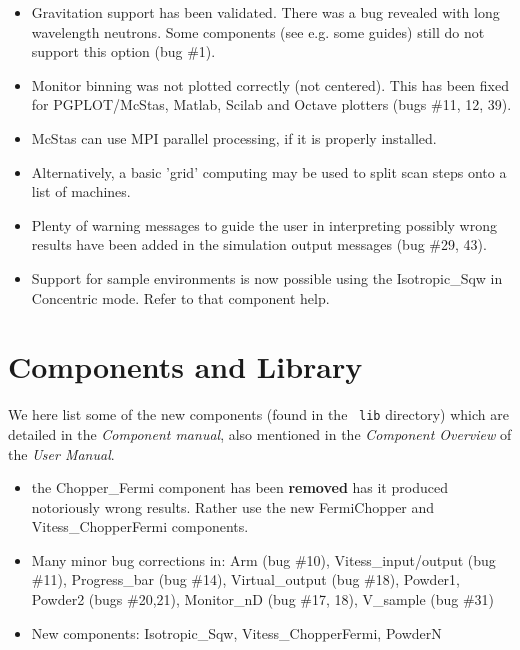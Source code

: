 \begin{itemize}
\item Gravitation support has been validated. There was a bug revealed with long wavelength neutrons. Some components (see e.g. some guides) still do not support this option (bug \#1).
\item Monitor binning was not plotted correctly (not centered). This has been fixed for PGPLOT/McStas, Matlab, Scilab and Octave plotters (bugs \#11, 12, 39).

\item McStas can use MPI parallel processing, if it is properly installed.
\item Alternatively, a basic 'grid' computing may be used to split scan steps onto a list of machines.

\item Plenty of warning messages to guide the user in interpreting possibly wrong results have been added in the simulation output messages (bug \#29, 43).
\item Support for sample environments is now possible using the Isotropic\_Sqw in Concentric mode. Refer to that component help.

\end{itemize}


\section{Components and Library}
\label{s:new-features:components}
 

We here list some of the new components (found in the \MCS\ \verb+lib+ directory)
which are detailed in the {\it Component manual}, also mentioned in
the {\it Component Overview} of the {\it User Manual}.

\begin{itemize}
\item the Chopper\_Fermi component has been {\bf removed} has it produced notoriously wrong results. Rather use the new FermiChopper and Vitess\_ChopperFermi components.
\item Many minor bug corrections in:
Arm (bug \#10),
Vitess\_input/output (bug \#11),
Progress\_bar (bug \#14),
Virtual\_output (bug \#18),
Powder1, Powder2 (bugs \#20,21),
Monitor\_nD (bug \#17, 18),
V\_sample (bug \#31)
\item New components:
Isotropic\_Sqw,
Vitess\_ChopperFermi,
PowderN
\end{itemize}

